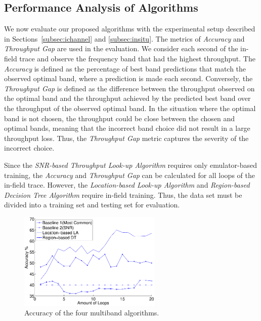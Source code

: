 \subsection{Performance Analysis of Algorithms}
\label{subsec:data process}

We now evaluate our proposed
algorithms with the experimental setup described in
Sections~\ref{subsec:ichannel} and \ref{subsec:insitu}.
The metrics of
{\it Accuracy} and {\it Throughput Gap} are used in the evaluation.
We consider each second of the in-field trace and
observe the frequency band that had the highest 
throughput.  The \emph{Accuracy} is defined as the percentage of 
best band predictions that match the observed optimal band, where a prediction
is made each second.  Conversely, the \emph{Throughput Gap} is defined
as the difference between the throughput observed on the optimal band
and the throughput achieved by the predicted best band over the
throughput of the observed optimal band. 
In the situation where the optimal band is not chosen, the throughput could be close between the chosen and optimal bands, meaning that the
incorrect band choice did not result in a large throughput loss. Thus, the 
\emph{Throughput Gap} metric captures the severity of the incorrect choice.

%
%

Since the \emph{SNR-based Throughput Look-up Algorithm} requires only 
emulator-based training, the \emph{Accuracy} and \emph{Throughput Gap} can 
be calculated for all loops of the in-field trace.  However, the 
\emph{Location-based Look-up Algorithm} and \emph{Region-based Decision
Tree Algorithm} require in-field training. Thus, the data set must be
divided into a training set and testing set for evaluation.

\begin{figure}
\centering
\includegraphics[width=68mm]{figures/performance_accuracy}
\vspace{-0.1in}
\caption{Accuracy of the four multiband algorithms.}
\label{fig:performance}
\end{figure}

